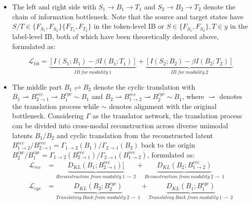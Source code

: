 \documentclass{article}
\begin{document}
\begin{itemize}[leftmargin=*]

\item The left and right side with $S_1 \rightarrow B_1 \rightarrow T_1$ and $S_2 \rightarrow B_2 \rightarrow T_2$ denote the chain of information bottleneck. Note that the source and target states have $S/T\in\{F_{S_1},F_{S_2}\}\{F_{T_1},F_{T_2}\}$ in the token-level IB or $S\in\{F_{S_1},F_{S_2}\},T\in y$ in the label-level IB, both of which have been theoretically deduced above, formulated as:

\begin{equation}
\mathcal{L}_{tib} = \underbrace{[I(S_1;B_1)-\beta I(B_1;T_1)]}_{IB\ for\ modality\ 1} + \underbrace{[I(S_2;B_2)-\beta I(B_2;T_2)]}_{IB\ for\ modality\ 2}
\end{equation}

\item The middle part $B_1 \rightleftharpoons B_2$ denote the cyclic translation with $B_1 \rightharpoonup B^{rec}_{2\rightarrow 1}\rightharpoonup B^{cyc}_1 \sim B_1$ and $B_2 \rightharpoonup B^{rec}_{1\rightarrow2}\rightharpoonup B^{cyc}_2 \sim B_1$, where $\rightharpoonup$ denotes the translation process while $\sim$ denotes alignment with the original bottleneck. Considering $\Gamma$ as the translator network, the translation process can be divided into cross-modal reconstruction across diverse unimodal latents $B_1/B_2$ and cyclic translation from the reconstructed latent $B^{rec}_{1\rightarrow2}/B^{rec}_{2\rightarrow1}=\Gamma_{1\rightarrow 2}(B_1)/\Gamma_{2\rightarrow 1}(B_2)$ back to the origin $B^{cyc}_2/B^{cyc}_1=\Gamma_{1\rightarrow 2} (B^{rec}_{2\rightarrow 1})/\Gamma_{2\rightarrow 1} (B^{rec}_{1\rightarrow 2})$, formulated as:
\begin{equation}
\begin{aligned}
\mathcal{L}_{rec}&= \underbrace{D_{KL}(B_1;B^{rec}_{2\rightarrow 1})]}_{Reconstruction\ from\ modality\ 1 \rightharpoonup\ 2}+\underbrace{D_{KL}(B_2;B^{rec}_{1\rightarrow 2})}_{Reconstruction\ from\ modality\ 2 \rightharpoonup\ 1} \\
\mathcal{L}_{cyc}&=\underbrace{D_{KL}(B_2;B^{cyc}_2)}_{Translating\ Back\ from\ modality\ 2 \rightharpoonup\ 1} +\underbrace{{D_{KL}(B_1;B^{cyc}_1)}}_{Translating\ Back\ from\ modality\ 1 \rightharpoonup\ 2}
\end{aligned}
\end{equation}

\end{itemize}
\end{document}
